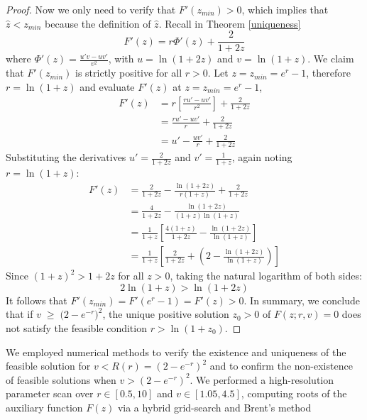 \documentclass[12pt]{article}
\theoremstyle{definition}
\begin{document}
\begin{proof}
Now we only need to verify that $F'(z_{min})>0$, which implies that $\hat{z} < z_{min}$ because the definition of $\hat{z}$. Recall in Theorem \ref{uniqueness}
\begin{equation}
    F'(z) = r \Phi'(z) + \frac{2}{1+2z}
\end{equation}
where $\Phi'(z) = \frac{u'v - uv'}{v^2}$, with $u = \ln(1+2z)$ and $v = \ln(1+z)$. We claim that $F'(z_{min})$ is strictly positive for all $r > 0$. Let $z=z_{min}= e^r - 1$,  therefore $r = \ln(1+z)$ and evaluate $F'(z)$ at $z=z_{min} = e^r - 1$,
\begin{align}
    F'(z) &= r \left[ \frac{r u' - u v'}{r^2} \right] + \frac{2}{1+2z} \\
          &= \frac{r u' - u v'}{r} + \frac{2}{1+2z} \\
          &= u' - \frac{u v'}{r} + \frac{2}{1+2z}
\end{align}
Substituting the derivatives $u' = \frac{2}{1+2z}$ and $v' = \frac{1}{1+z}$, again noting $r = \ln(1+z)$:
\begin{align}
    F'(z) &= \frac{2}{1+2z} - \frac{\ln(1+2z)}{r(1+z)} + \frac{2}{1+2z} \\
          &= \frac{4}{1+2z} - \frac{\ln(1+2z)}{(1+z)\ln(1+z)}\\
          &= \frac{1}{1+z} [\frac{4(1+z)}{1+2z} - \frac{\ln(1+2z)}{\ln(1+z)}]\\
          &= \frac{1}{1+z} [\frac{2}{1+2z} + (2 - \frac{\ln(1+2z)}{\ln(1+z)})]          
\end{align}
Since $(1+z)^2 > 1 + 2z$ for all $z>0$, taking the natural logarithm of both sides:
\begin{equation}
 2\ln(1+z) > \ln(1+2z)
\end{equation}
It follows that  $F'(z_{min})=F'(e^r - 1)=F'(z)>0$.  In summary, we conclude that if $v \; \geq \; \big(2-e^{-r}\big)^2$, the unique positive solution $z_0>0$ of $F(z;r,v)=0$ does not satisfy the feasible condition $r >\ln(1+z_0)$.  
\end{proof}
We employed numerical methods to verify the existence and uniqueness of the feasible solution for $v < R(r)=(2 - e^{-r})^2$ and to confirm the non-existence of feasible solutions when $v > (2 - e^{-r})^2$. We performed a high-resolution parameter scan over $r \in [0.5, 10]$ and $v \in [1.05, 4.5]$, computing roots of the auxiliary function $F(z)$ via a hybrid grid-search and Brent's method 
\end{document}

